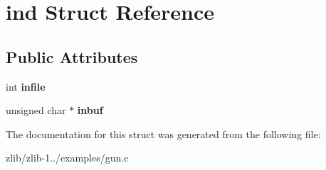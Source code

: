 \hypertarget{structind}{\section{ind Struct Reference}
\label{structind}
}
\subsection*{Public Attributes}
\begin{DoxyCompactItemize}
\item 
\hypertarget{structind_af2f798c95f438a3718632db7d21e219a}{int {\bfseries infile}}\label{structind_af2f798c95f438a3718632db7d21e219a}

\item 
\hypertarget{structind_ad078e2401b1613717ee6f13610bb2d68}{unsigned char $\ast$ {\bfseries inbuf}}\label{structind_ad078e2401b1613717ee6f13610bb2d68}

\end{DoxyCompactItemize}


The documentation for this struct was generated from the following file\+:\begin{DoxyCompactItemize}
\item 
zlib/zlib-\/1../examples/gun.\+c\end{DoxyCompactItemize}
